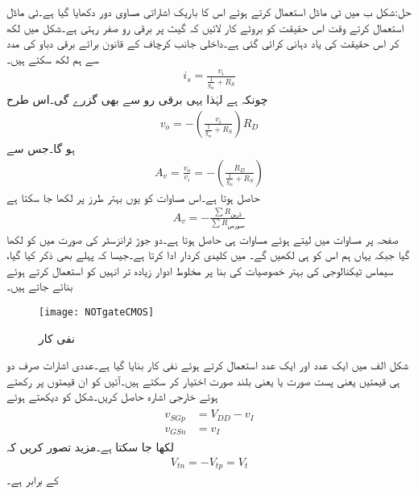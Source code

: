 حل:شکل  ب میں ٹی ماڈل استعمال کرتے ہوئے اس کا باریک اشاراتی مساوی دور دکھایا گیا ہے۔ٹی ماڈل استعمال کرتے وقت اس حقیقت کو بروئے کار لائیں کہ گیٹ پر برقی رو صفر رہتی ہے۔شکل میں  لکھ کر اس حقیقت کی یاد دہانی کرائی گئی ہے۔داخلی جانب کرچاف کے قانون برائے برقی دباو کی مدد سے ہم لکھ سکتے ہیں۔
\begin{align*}
i_s=\frac{v_i}{\frac{1}{g_m}+R_S}
\end{align*}
چونکہ  ہے لہٰذا یہی برقی رو  سے بھی گزرے گی۔اس طرح
\begin{align*}
v_o=-\left(\frac{v_i}{\frac{1}{g_m}+R_S} \right) R_D
\end{align*}
ہو گا۔جس سے
\begin{align}
A_v=\frac{v_o}{v_i}=-\left(\frac{R_D}{\frac{1}{g_m}+R_S} \right) 
\end{align}
حاصل ہوتا ہے۔اس مساوات کو یوں بہتر طرز پر لکھا جا سکتا ہے
\begin{align}\label{مساوات_ماسفیٹ_افزائش_بطور_مزاحت_کی_شرح}
A_v=-\frac{\sum R_{\textrm{ڈرین}}}{\sum R_{\textrm{سورس}}}
\end{align}
صفحہ  پر مساوات  میں  لیتے ہوئے مساوات  ہی حاصل ہوتا ہے۔دو جوڑ ٹرانزسٹر کی صورت میں  کو  لکھا گیا جبکہ یہاں  ہم اس کو  ہی لکھیں گے۔
 میں  کلیدی کردار ادا کرتا ہے۔جیسا کہ پہلے بھی ذکر کیا گیا، سیماس ٹیکنالوجی کی بہتر خصوصیات کی بنا پر مخلوط ادوار زیادہ تر انہیں کو استعمال کرتے ہوئے بنائے جاتے ہیں۔ 
\begin{figure}
\centering
\texttt{[image: NOTgateCMOS]}
\caption{نفی کار}
\label{شکل_ماسفیٹ_نفی_کار_الف}
\end{figure}

شکل   الف میں ایک عدد  اور ایک عدد  استعمال کرتے ہوئے  نفی کار بنایا گیا ہے۔عددی اشارات صرف دو ہی قیمتیں  یعنی پست صورت  یا  یعنی بلند صورت اختیار کر سکتے ہیں۔آئیں  کو ان قیمتوں پر رکھتے ہوئے خارجی اشارہ  حاصل کریں۔شکل کو دیکھتے ہوئے
\begin{gather}
\begin{aligned}\label{مساوات_ماسفیٹ_ناٹ_گیٹ_الف}
v_{SGp}&=V_{DD}-v_I\\
v_{GSn}&=v_I
\end{aligned}
\end{gather}
لکھا جا سکتا ہے۔مزید تصور کریں کہ 
\begin{align}
V_{tn}=-V_{tp}=V_t
\end{align}
کے برابر ہے۔

